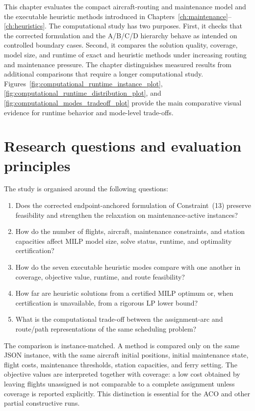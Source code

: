 This chapter evaluates the compact aircraft-routing and maintenance model and
 the executable heuristic methods introduced in Chapters~\ref{ch:maintenance}--
\ref{ch:heuristics}. The computational study has two purposes. First, it
checks that the corrected formulation and the A/B/C/D hierarchy behave as
intended on controlled boundary cases. Second, it compares the solution quality,
coverage, model size, and runtime of exact and heuristic methods under increasing
routing and maintenance pressure. The chapter distinguishes measured results
from additional comparisons that require a longer computational study.
Figures~\ref{fig:computational_runtime_instance_plot},
\ref{fig:computational_runtime_distribution_plot}, and
\ref{fig:computational_modes_tradeoff_plot} provide the main comparative
visual evidence for runtime behavior and mode-level trade-offs.

\section{Research questions and evaluation principles}
\label{sec:computational_questions}

The study is organised around the following questions:

\begin{enumerate}
    \item Does the corrected endpoint-anchored formulation of Constraint~(13)
    preserve feasibility and strengthen the relaxation on maintenance-active
    instances?
    \item How do the number of flights, aircraft, maintenance constraints, and
    station capacities affect MILP model size, solve status, runtime, and
    optimality certification?
    \item How do the seven executable heuristic modes compare with one another
    in coverage, objective value, runtime, and route feasibility?
    \item How far are heuristic solutions from a certified MILP optimum or,
    when certification is unavailable, from a rigorous LP lower bound?
    \item What is the computational trade-off between the assignment-arc and
    route/path representations of the same scheduling problem?
\end{enumerate}

The comparison is instance-matched. A method is compared only on the same JSON
instance, with the same aircraft initial positions, initial maintenance state,
flight costs, maintenance thresholds, station capacities, and ferry setting.
The objective values are interpreted together with coverage: a low cost obtained
by leaving flights unassigned is not comparable to a complete assignment unless
coverage is reported explicitly. This distinction is essential for the ACO and
other partial constructive runs.

